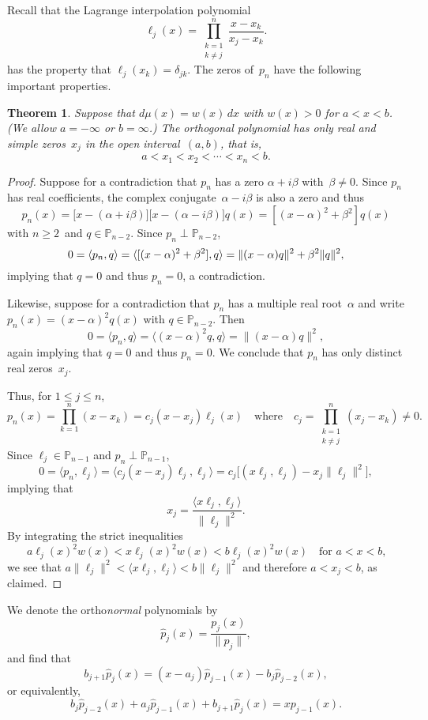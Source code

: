 \documentclass[12pt,a4paper]{article}
\newtheorem{theorem}{Theorem}
\newcommand{\iprod}[1]{\langle#1\rangle}
\newcommand{\Poly}{\mathbb{P}}
\begin{document}
Recall that the Lagrange interpolation polynomial
\[
\ell_j(x)=\prod_{\substack{k=1\\ k\ne j}}^n\frac{x-x_k}{x_j-x_k}.
\]
has the property that $\ell_j(x_k)=\delta_{jk}$. The zeros of~$p_n$ 
have the following important properties.  

\begin{theorem}
Suppose that $d\mu(x)=w(x)\,dx$ with $w(x)>0$ for $a<x<b$.
(We allow $a=-\infty$ or $b=\infty$.) The orthogonal polynomial has 
only real and simple zeros~$x_j$ in the open interval~$(a,b)$, that 
is,
\[
a<x_1<x_2<\cdots<x_n<b.
\]
\end{theorem}
\begin{proof}
Suppose for a contradiction that $p_n$ has a zero $\alpha+i\beta$ 
with~$\beta\ne0$.  Since $p_n$ has real coefficients, 
the complex conjugate~$\alpha-i\beta$ is also a zero and thus
\[
p_n(x)=\bigl[x-(\alpha+i\beta)\bigr]\bigl[x-(\alpha-i\beta)\bigr]q(x)
	=[(x-\alpha)^2+\beta^2]q(x)
\]
with $n\ge2$~and $q\in\Poly_{n-2}$. Since $p_n\perp\Poly_{n-2}$,
\[
0=\iprod{p_n,q}=\iprod{[(x-\alpha)^2+\beta^2],q}\\
	=\|(x-\alpha)q\|^2+\beta^2\|q\|^2,
\]
implying that $q=0$ and thus $p_n=0$, a contradiction.

Likewise, suppose for a contradiction that $p_n$ has a multiple real 
root~$\alpha$ and write $p_n(x)=(x-\alpha)^2q(x)$ with 
$q\in\Poly_{n-2}$.  Then
\[
0=\iprod{p_n,q}=\iprod{(x-\alpha)^2q,q}=\|(x-\alpha)q\|^2,
\]
again implying that $q=0$ and thus $p_n=0$.  We conclude that $p_n$ 
has only distinct real zeros~$x_j$.

Thus, for $1\le j\le n$,
\[
p_n(x)=\prod_{k=1}^n(x-x_k)=c_j(x-x_j)\ell_j(x)
\quad\text{where}\quad
c_j=\prod_{\substack{k=1\\ k\ne j}}^n(x_j-x_k)\ne0.
\]
Since $\ell_j\in\Poly_{n-1}$ and $p_n\perp\Poly_{n-1}$,
\[
0=\iprod{p_n,\ell_j}=\iprod{c_j(x-x_j)\ell_j,\ell_j}
	=c_j\bigl[(x\ell_j,\ell_j)-x_j\|\ell_j\|^2\bigr],
\]
implying that
\[
x_j=\frac{\iprod{x\ell_j,\ell_j}}{\|\ell_j\|^2}.
\]
By integrating the strict inequalities
\[
a\ell_j(x)^2w(x)<x\ell_j(x)^2w(x)<b\ell_j(x)^2w(x)
	\quad\text{for $a<x<b$,}
\]
we see that $a\|\ell_j\|^2<\iprod{x\ell_j,\ell_j}<b\|\ell_j\|^2$
and therefore $a<x_j<b$, as claimed.
\end{proof}

We denote the ortho\emph{normal} polynomials by
\[
\hat p_j(x)=\frac{p_j(x)}{\|p_j\|},
\]
and find that
\[
b_{j+1}\hat p_j(x)=(x-a_j)\hat p_{j-1}(x)-b_j\hat p_{j-2}(x),
\]
or equivalently,
\begin{equation}\label{eq: 3 term orthog}
b_j\hat p_{j-2}(x)+a_j\hat p_{j-1}(x)+b_{j+1}\hat p_j(x)=xp_{j-1}(x).
\end{equation}
\end{document}
